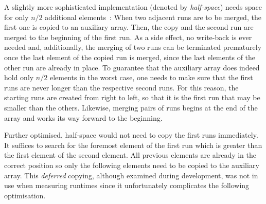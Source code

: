 A slightly more sophisticated implementation (denoted by \emph{half-space}) needs space for only \(n/2\) additional elements~\cite[Chapter~2.5]{lang2009algorithmen}:
When two adjacent runs are to be merged, the first one is copied to an auxiliary array.
Then, the copy and the second run are merged to the beginning of the first run.
As a side effect, no write-back is ever needed and, additionally, the merging of two runs can be terminated prematurely once the last element of the copied run is merged, since the last elements of the other run are already in place.
To guarantee that the auxiliary array does indeed hold only \(n/2\) elements in the worst case, one needs to make sure that the first runs are never longer than the respective second runs.
For this reason, the starting runs are created from right to left, so that it is the first run that may be smaller than the others.
Likewise, merging pairs of runs begins at the end of the array and works its way forward to the beginning.

Further optimised, half-space \MS{} would not need to copy the first runs immediately.
It suffices to search for the foremost element of the first run which is greater than the first element of the second element.
All previous elements are already in the correct position so only the following elements need to be copied to the auxiliary array.
This \emph{deferred} copying, although examined during development, was not in use when measuring runtimes since it unfortunately complicates the following optimisation.


